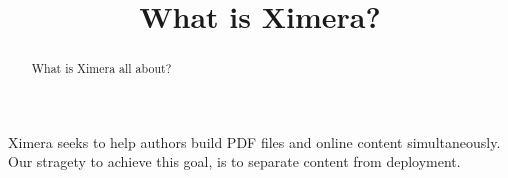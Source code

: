 \documentclass{ximera}
\title{What is Ximera?}
\begin{document}
\begin{abstract}
What is Ximera all about?
\end{abstract}
\maketitle

Ximera seeks to help authors build PDF files and online content
simultaneously. Our stragety to achieve this goal, is to separate
content from deployment.
\end{document}
